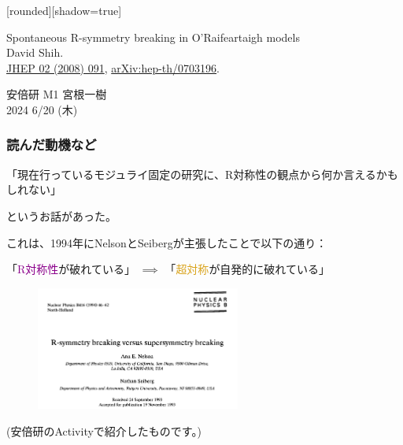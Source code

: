 \documentclass[
  unicode,a4paper,9pt,
  xcolor = {dvipsnames,svgnames},
  hyperref ={colorlinks=true,citecolor=Navy,linkcolor=NavyBlue,urlcolor=purple},
  ja=standard,lualatex
]{beamer}
\begin{document}
\begin{frame}

  [rounded][shadow=true]
  \begin{block}{}
    \vspace*{5pt}

    \centering\Large
    Spontaneous R-symmetry breaking in O'Raifeartaigh models
    \\
    \normalsize
    David Shih.
    \\
    \small
    \href{https://doi.org/10.1088/1126-6708/2008/02/091}{JHEP 02 (2008) 091},
    \href{https://arxiv.org/abs/hep-th/0703196}{arXiv:hep-th/0703196}.

    \vspace*{5pt}
  \end{block}

  \vspace*{1cm}

  \begin{center}
    安倍研 M1 宮根一樹\\
    2024 6/20 (木)
  \end{center}

\end{frame}

\nocite{Shih:2007av}

\begin{frame}
  \frametitle{読んだ動機など}

  \begin{center}
    「現在行っているモジュライ固定の研究に、R対称性の観点から何か言えるかもしれない」
  \end{center}
  というお話があった。

  これは、1994年にNelsonとSeibergが主張したこと\cite{Nelson:1993nf}で以下の通り：
  \begin{center}
    「\textcolor{DarkMagenta}{R対称性}が破れている」
    $\implies$
    「\textcolor{Goldenrod}{超対称}が自発的に破れている」
  \end{center}

  \begin{figure}
    \centering
    \includegraphics[width=0.6\textwidth]{fig/Nelson1993nf.PNG}
  \end{figure}

  \begin{center}
    (安倍研のActivityで紹介したものです。)
  \end{center}

\end{frame}
\end{document}
